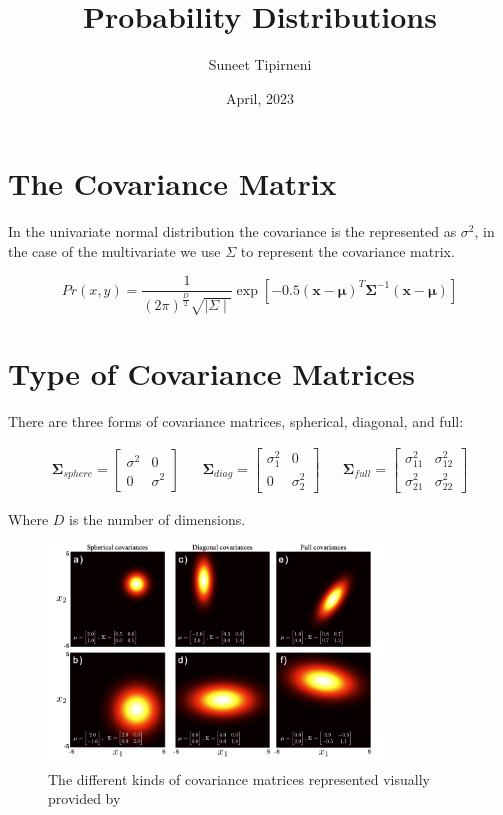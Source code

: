\documentclass{article}
\title{Probability Distributions}
\date{April, 2023}
\author{Suneet Tipirneni}
\begin{document}
\maketitle

\section{The Covariance Matrix}

In the univariate normal distribution the covariance is the represented as $\sigma^2$, in the case of the multivariate we use $\Sigma$ to represent the covariance matrix.  \par

\begin{equation}\label{eq:norm}
	Pr\left( x,y \right) = \frac{1}{\left( 2\pi \right)^{\frac{D}{2}}\sqrt{ \mid \Sigma \mid}}\exp\left[ -0.5\left( \pmb{x} - \pmb{\mu} \right)^{T} \pmb{\Sigma}^{-1} \left( \pmb{x} - \pmb{\mu} \right)  \right] 
\end{equation}

\section{Type of Covariance Matrices}

There are three forms of covariance matrices, spherical, diagonal, and full:

\begin{align}
	\pmb{\Sigma}_{sphere} = \begin{bmatrix} \sigma^2 & 0 \\ 0 & \sigma^2  \end{bmatrix} &&
	\pmb{\Sigma}_{diag} = \begin{bmatrix} \sigma_1^2 & 0 \\ 0 & \sigma_2^2 \end{bmatrix} && 
	\pmb{\Sigma}_{full} = \begin{bmatrix} \sigma_{11}^2 & \sigma_{12}^2 \\ \sigma_{21}^2 & \sigma_{22}^2 \end{bmatrix} 
\end{align}

Where $D$ is the number of dimensions.

\begin{figure}[htpb]
	\centering
	\includegraphics[width=0.8\textwidth]{imgs/type-cov.png}
	\caption{The different kinds of covariance matrices represented visually provided by \cite{princeCVMLI2012}}
	\label{fig:type-cov}
\end{figure}
\end{document}
